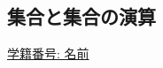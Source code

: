 \documentclass[dvipdfmx,a4paper,11pt]{article}
\theoremstyle{definition}
\begin{document}

\newpage

\begin{center}
\section{集合と集合の演算}
\label{sec-1}
\end{center}

\begin{flushleft}
{ \large \underline{学籍番号: \hspace{4cm} 名前  \hspace{8.5cm}}}
\end{flushleft}
\end{document}
